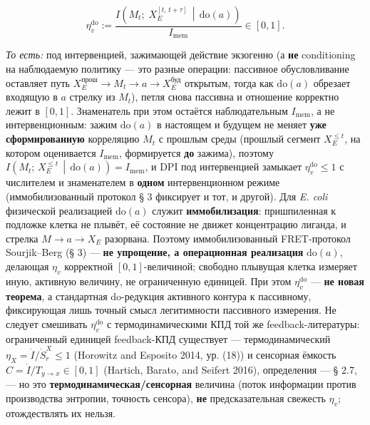 \documentclass[pdflatex,sn-mathphys-ay]{sn-jnl}
\begin{document}
\begin{equation}\eta_v^{\mathrm{do}} := \frac{I\!\left(M_t;\; X_E^{[t,\,t+\tau]} \,\middle|\, \mathrm{do}(a)\right)}{I_{\text{mem}}}
  \in [0, 1]. \tag{1b}\end{equation}

\emph{То есть:} под интервенцией, зажимающей действие экзогенно (а \textbf{не} conditioning на наблюдаемую политику --- это разные операции: пассивное обусловливание оставляет путь \(X_E^{\text{прош}} \to M_t \to a \to X_E^{\text{буд}}\) открытым, тогда как \(\mathrm{do}(a)\) обрезает входящую в \(a\) стрелку из \(M_t\)), петля снова пассивна и отношение корректно лежит в \([0, 1]\). Знаменатель при этом остаётся наблюдательным \(I_{\text{mem}}\), а не интервенционным: зажим \(\mathrm{do}(a)\) в настоящем и будущем не меняет \textbf{уже сформированную} корреляцию \(M_t\) с прошлым среды (прошлый сегмент \(X_E^{\le t}\), на котором оценивается \(I_{\text{mem}}\), формируется \textbf{до} зажима), поэтому \(I\!\left(M_t;\, X_E^{\le t}\,\middle|\,\mathrm{do}(a)\right) = I_{\text{mem}}\), и DPI под интервенцией замыкает \(\eta_v^{\mathrm{do}} \le 1\) с числителем и знаменателем в \textbf{одном} интервенционном режиме (иммобилизованный протокол § 3 фиксирует и тот, и другой). Для \emph{E. coli} физической реализацией \(\mathrm{do}(a)\) служит \textbf{иммобилизация}: пришпиленная к подложке клетка не плывёт, её состояние не движет концентрацию лиганда, и стрелка \(M \to a \to X_E\) разорвана. Поэтому иммобилизованный FRET-протокол Sourjik--Berg (§ 3) --- \textbf{не упрощение, а операционная реализация} \(\mathrm{do}(a)\), делающая \(\eta_v\) корректной \([0, 1]\)-величиной; свободно плывущая клетка измеряет иную, активную величину, не ограниченную единицей. При этом \(\eta_v^{\mathrm{do}}\) --- \textbf{не новая теорема}, а стандартная do-редукция активного контура к пассивному, фиксирующая лишь точный смысл легитимности пассивного измерения. Не следует смешивать \(\eta_v^{\mathrm{do}}\) с термодинамическими КПД той же feedback-литературы: ограниченный единицей feedback-КПД существует --- термодинамический \(\eta_X = \dot I/\dot S_r^X \le 1\) (Horowitz and Esposito 2014, ур. (18)) и сенсорная ёмкость \(C = \dot I/T_{y\to x} \in [0, 1]\) (Hartich, Barato, and Seifert 2016), определения --- § 2.7, --- но это \textbf{термодинамическая/сенсорная} величина (поток информации против производства энтропии, точность сенсора), \textbf{не} предсказательная свежесть \(\eta_v\); отождествлять их нельзя.
\end{document}
